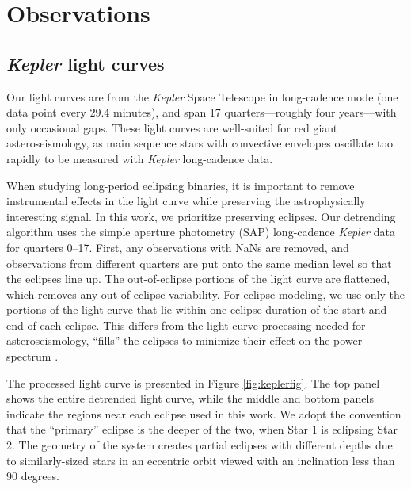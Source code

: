 \section{Observations}\label{data}

\subsection{\emph{Kepler} light curves}\label{kepler}
Our light curves are from the \emph{Kepler} Space Telescope in long-cadence mode (one data point every 29.4 minutes), and span 17 quarters---roughly four years---with only occasional gaps. These light curves are well-suited for red giant asteroseismology, as main sequence stars with convective envelopes oscillate too rapidly to be measured with \emph{Kepler} long-cadence data.

When studying long-period eclipsing binaries, it is important to remove instrumental effects in the light curve while preserving the astrophysically interesting signal. In this work, we prioritize preserving eclipses. Our detrending algorithm uses the simple aperture photometry (SAP) long-cadence \emph{Kepler} data for quarters 0--17. First, any observations with NaNs are removed, and observations from different quarters are put onto the same median level so that the eclipses line up. The out-of-eclipse portions of the light curve are flattened, which removes any out-of-eclipse variability. For eclipse modeling, we use only the portions of the light curve that lie within one eclipse duration of the start and end of each eclipse. This differs from the light curve processing needed for asteroseismology,  ``fills'' the eclipses to minimize their effect on the power spectrum \citep{gau14}.

The processed light curve is presented in Figure \ref{fig:keplerfig}. The top panel shows the entire detrended light curve, while the middle and bottom panels indicate the regions near each eclipse used in this work. We adopt the convention that the ``primary'' eclipse is the deeper of the two, when Star 1 is eclipsing Star 2. The geometry of the system creates partial eclipses with different depths due to similarly-sized stars in an eccentric orbit viewed with an inclination less than 90 degrees.
  
  
  